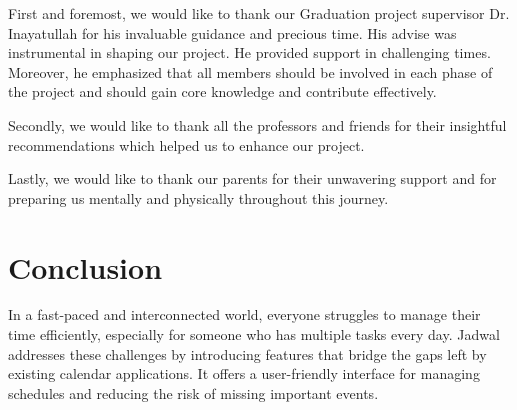 \documentclass[12pt,a4paper,twoside]{report}
\begin{document}
\begin{singlespace}
    \begin{justify}
        First and foremost, we would like to thank our Graduation project supervisor Dr. Inayatullah for his invaluable guidance and precious time. His advise was instrumental in shaping our project. He provided support in challenging times. Moreover, he emphasized that all members should be involved in each phase of the project and should gain core knowledge and contribute effectively.

        Secondly, we would like to thank all the professors and friends for their insightful recommendations which helped us to enhance our project.

        Lastly, we would like to thank our parents for their unwavering support and for preparing us mentally and physically throughout this journey.
    \end{justify}

    \cleardoublepage

    \tableofcontents

    \cleardoublepage

    \listoffigures

    \cleardoublepage

    \listoftables

    \glsaddall
    \printglossary[title={List of Abbreviations and Terminology}]

\end{singlespace}

\cleardoublepage










\chapter*{Conclusion}

In a fast-paced and interconnected world, everyone struggles to manage their time efficiently, especially for someone who has multiple tasks every day. Jadwal addresses these challenges by introducing features that bridge the gaps left by existing calendar applications. It offers a user-friendly interface for managing schedules and reducing the risk of missing important events.
\end{document}
